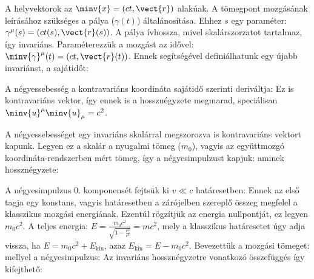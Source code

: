    A helyvektorok az $\minv{x}=(ct,\vect{r})$ alakúak.
   A tömegpont mozgásának leírásához szükséges a pálya ($\gamma(t)$) általánosítása.
   Ehhez $s$ egy paraméter: $\gamma^\mu(s)=(ct(s),\vect{r}(s))$.
   A pálya ívhossza, mivel skalárszorzatot tartalmaz, így invariáns.
   Paraméterezzük a mozgást az idővel: $\minv{\gamma}^\mu(t)=(ct,\vect{r}(t))$.
   Ennek segítségével definiálhatunk egy újabb invariánst, a sajátidőt:
   
   A négyessebesség a kontravariáns koordináta sajátidő szerinti deriváltja:
   Ez is kontravariáns vektor, így ennek is a hossznégyzete megmarad, speciálisan $\minv{u}^\mu\minv{u}_\mu=c^2$. 
   
   A négyessebességet egy invariáns skalárral megszorozva is kontravariáns vektort kapunk.
   Legyen ez a skalár a nyugalmi tömeg ($m_0$), vagyis az együttmozgó koordináta-rendszerben mért tömeg, így a négyesimpulzust kapjuk:
   aminek hossznégyzete: 
   
   A négyesimpulzus 0. komponensét fejtsük ki $v\ll c$ határesetben:
   Ennek az első tagja egy konstans, vagyis határesetben a zárójelben szereplő összeg megfelel a klasszikus mozgási energiának.
   Ezentúl rögzítjük az energia nullpontját, ez legyen $m_0c^2$.
   A teljes energia: $E=\frac{m_0c^2}{\sqrt{1-\frac{v^2}{c^2}}}=mc^2$, mely a klasszikus határesetet úgy adja vissza, ha $E=m_0c^2+E_\text{kin}$, azaz $E_\text{kin}=E-m_0c^2$.
   Bevezettük a mozgási tömeget:
   mellyel a négyesimpulzus:
   Az invariáns hossznégyzetre vonatkozó összefüggés így kifejthető:
   
